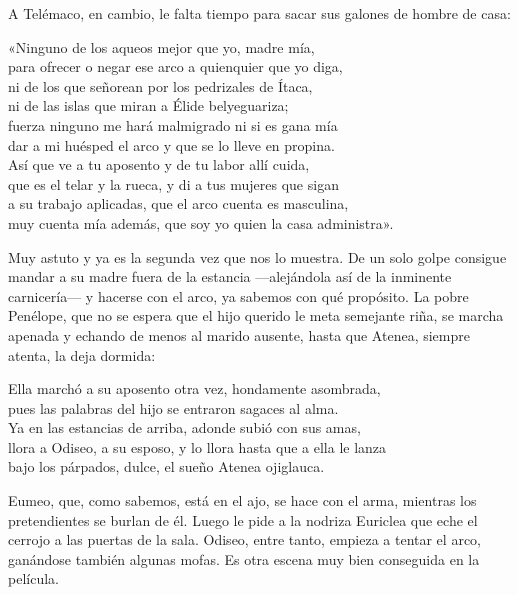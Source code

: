 A Telémaco, en cambio, le falta tiempo para sacar sus galones de hombre de casa:

\begin{versocita}
«Ninguno de los aqueos mejor que yo, madre mía,\\
para ofrecer o negar ese arco a quienquier que yo diga,\\
ni de los que señorean por los pedrizales de Ítaca,\\
ni de las islas que miran a Élide belyeguariza;\\
fuerza ninguno me hará malmigrado ni si es gana mía\\
dar a mi huésped el arco y que se lo lleve en propina.\\
Así que ve a tu aposento y de tu labor allí cuida,\\
que es el telar y la rueca, y di a tus mujeres que sigan\\
a su trabajo aplicadas, que el arco cuenta es masculina,\\
muy cuenta mía además, que soy yo quien la casa administra».
\end{versocita}

Muy astuto y ya es la segunda vez que nos lo muestra. De un solo golpe consigue mandar a su madre fuera de la estancia ---alejándola así de la inminente carnicería--- y hacerse con el arco, ya sabemos con qué propósito. La pobre Penélope, que no se espera que el hijo querido le meta semejante riña, se marcha apenada y echando de menos al marido ausente, hasta que Atenea, siempre atenta, la deja dormida:

\begin{versocita}
Ella marchó a su aposento otra vez, hondamente asombrada,\\
pues las palabras del hijo se entraron sagaces al alma.\\
Ya en las estancias de arriba, adonde subió con sus amas,\\
llora a Odiseo, a su esposo, y lo llora hasta que a ella le lanza\\
bajo los párpados, dulce, el sueño Atenea ojiglauca.
\end{versocita}

Eumeo, que, como sabemos, está en el ajo, se hace con el arma, mientras los pretendientes se burlan de él. Luego le pide a la nodriza Euriclea que eche el cerrojo a las puertas de la sala. Odiseo, entre tanto, empieza a tentar el arco, ganándose también algunas mofas. Es otra escena muy bien conseguida en la película.

